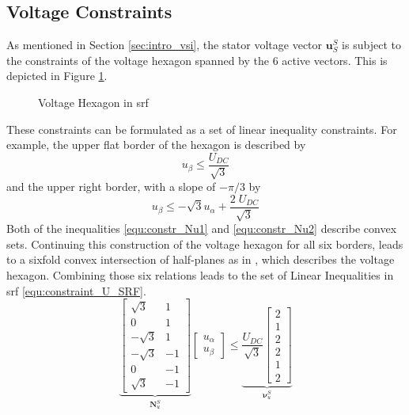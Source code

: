 \subsection{Voltage Constraints} \label{sec:mpcc_opt_v}
As mentioned in Section \ref{sec:intro_vsi}, the stator voltage vector $\bm{u}_S^S$ is subject to the constraints of the voltage hexagon spanned by the 6 active vectors. This is depicted in Figure \ref{fig:2_SRF_hexagon}.

\begin{figure}[h]
	\centering
	
	\caption{Voltage Hexagon in \acrshort{srf}}
	\label{fig:2_SRF_hexagon}
\end{figure}

These constraints can be formulated as a set of linear inequality constraints. For example, the upper flat border of the hexagon is described by 
\begin{equation}
	u_\beta \le \frac{U_{DC}}{\sqrt{3}}
	\label{equ:constr_Nu1}
\end{equation}
and the upper right border, with a slope of $-\pi/3$ by
\begin{equation}
	u_\beta \le -{\sqrt{3}} u_\alpha + \frac{2\;U_{DC}}{\sqrt{3}}
	\label{equ:constr_Nu2}
\end{equation}
Both of the inequalities \eqref{equ:constr_Nu1} and \eqref{equ:constr_Nu2} describe convex sets. Continuing this construction of the voltage hexagon for all six borders, leads to a sixfold convex intersection of half-planes as in \cite{LMIVHex} \cite{NeunerMA}, which describes the voltage hexagon. Combining those six relations leads to the set of Linear Inequalities in \acrshort{srf} \eqref{equ:constraint_U_SRF}.
\begin{equation}
	\scriptstyle 
	\underbrace{
		\begin{bmatrix}
			\sqrt{3} & 1 \\
			0 & 1 \\
			-\sqrt{3} & 1 \\
			-\sqrt{3} & -1 \\
			0 & -1 \\
			\sqrt{3} & -1
		\end{bmatrix}
	}_{\bm{N}_u^S}
	\begin{bmatrix}
		u_\alpha\\
		u_\beta
	\end{bmatrix}
	\le
	\underbrace{
		\dfrac{U_{DC}}{\sqrt{3}}
		\begin{bmatrix}
			2\\
			1\\
			2\\
			2\\
			1\\
			2
		\end{bmatrix}
	}_{\bm{\nu}_u^S}
	\label{equ:constraint_U_SRF}
\end{equation}

